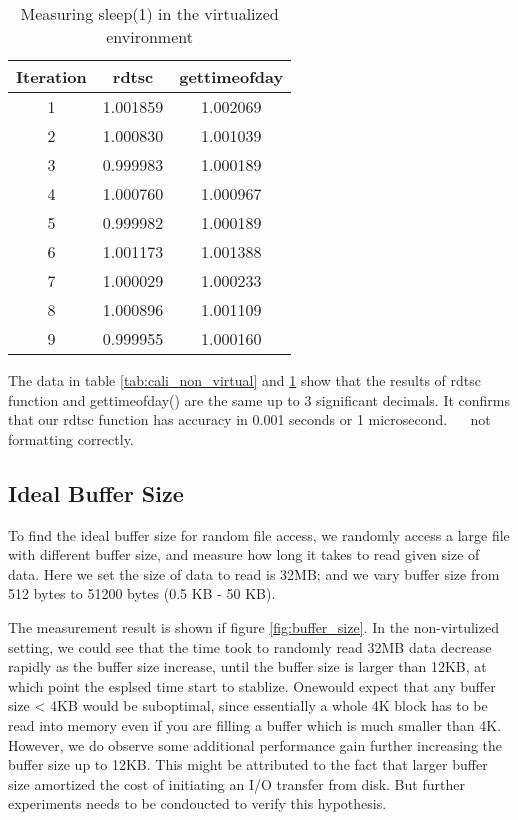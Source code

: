 \begin{table}[!thb]
\centering
\begin{tabular}{|c|c|c|} \hline
Iteration & rdtsc & gettimeofday \\ \hline
1 & 1.001859 & 1.002069 \\ \hline
2 & 1.000830 & 1.001039 \\ \hline
3 & 0.999983 & 1.000189 \\ \hline
4 & 1.000760 & 1.000967 \\ \hline
5 & 0.999982 & 1.000189 \\ \hline
6 & 1.001173 & 1.001388 \\ \hline
7 & 1.000029 & 1.000233 \\ \hline
8 & 1.000896 & 1.001109 \\ \hline
9 & 0.999955 & 1.000160 \\ \hline
\end{tabular}\label{tab:cali_virtual}
\caption{Measuring sleep(1) in the virtualized environment}
\end{table}

The data in table \ref{tab:cali_non_virtual} and \ref{tab:cali_virtual} show that the results of rdtsc function and gettimeofday() are the same up to 3 significant decimals. It confirms that our rdtsc function has accuracy in 0.001 seconds or 1 microsecond.
  
not formatting correctly.

\subsection{Ideal Buffer Size}
To find the ideal buffer size for random file access, we randomly access a large file with different buffer size, and measure how long it takes to read given size of data. Here we set the size of data to read is 32MB; and we vary buffer size from 512 bytes to 51200 bytes (0.5 KB - 50 KB). 

The measurement result is shown if figure \ref{fig:buffer_size}. In the non-virtulized setting, we could see that the time took to randomly read 32MB data decrease rapidly as the buffer size increase, until the buffer size is larger than 12KB, at which point the esplsed time start to stablize. Onewould expect that any buffer size < 4KB would be suboptimal, since essentially a whole 4K block has to be read into memory even if you are filling a buffer which is much smaller than 4K. However, we do observe some additional performance gain further increasing the buffer size up to 12KB. This might be attributed to the fact that larger buffer size amortized the cost of initiating an I/O transfer from disk. But further experiments needs to be condoucted to verify this hypothesis. 

